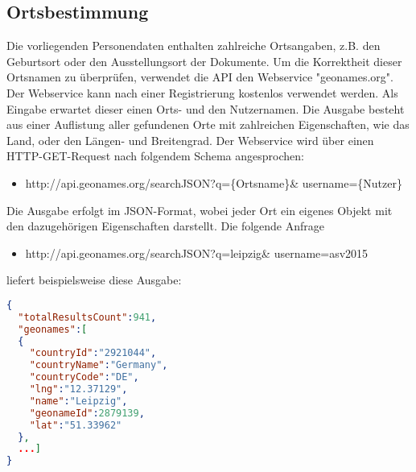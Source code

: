 \subsection{Ortsbestimmung}
 \label{subsec:Ortsbestimmung}
 Die vorliegenden Personendaten enthalten zahlreiche Ortsangaben, z.B. den Geburtsort oder den Ausstellungsort der Dokumente. Um die Korrektheit dieser Ortsnamen zu \"{u}berpr\"{u}fen, verwendet die API den Webservice "{}geonames.org"{}. Der Webservice kann nach einer Registrierung kostenlos verwendet werden. Als Eingabe erwartet dieser einen Orts- und den Nutzernamen. Die Ausgabe besteht aus einer Auflistung aller gefundenen Orte mit zahlreichen Eigenschaften, wie das Land, oder den L\"{a}ngen- und Breitengrad. Der Webservice wird \"{u}ber einen HTTP-GET-Request nach folgendem Schema angesprochen:
\begin{itemize}
\item http://api.geonames.org/searchJSON\newline ?q=\{Ortsname\}\& username=\{Nutzer\}
\end{itemize}
Die Ausgabe erfolgt im JSON-Format, wobei jeder Ort ein eigenes Objekt mit den dazugeh\"{o}rigen Eigenschaften darstellt. Die folgende Anfrage 
\begin{itemize}
\item http://api.geonames.org/searchJSON\newline ?q=leipzig\& username=asv2015
\end{itemize}
liefert beispielsweise diese Ausgabe:
\begin{lstlisting}[language=JSON]
{
  "totalResultsCount":941,
  "geonames":[
  {
    "countryId":"2921044",
    "countryName":"Germany",
    "countryCode":"DE",
    "lng":"12.37129",
    "name":"Leipzig",
    "geonameId":2879139,
    "lat":"51.33962"
  },
  ...]
}
\end{lstlisting}

